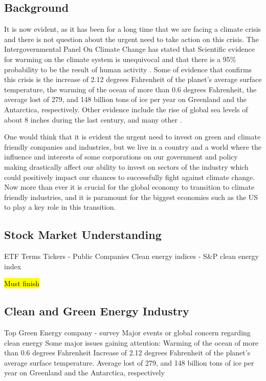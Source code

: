 \documentclass[sigconf, nonacm]{acmart}
\begin{document}
\subsection{Background}
\begin{flushleft}
It is now evident, as it has been for a long time that we are facing a climate crisis and there is not question about the urgent need to take action on this crisis. The Intergovernmental Panel On Climate Change has stated that Scientific evidence for warming on the climate system is unequivocal and that there is a 95\% probability to be the result of human activity \cite{nasa_2021}.  Some of evidence that confirms this crisis is the increase of 2.12 degrees Fahrenheit  of the planet's average surface temperature, the warming of the ocean of more than 0.6 degrees Fahrenheit, the average lost of 279, and 148 billion tons of ice per year on Greenland and the Antarctica, respectively. Other evidence include the rise of global sea levels of about 8 inches during the last century, and many other  \cite{nasa_2021}.
\end{flushleft}

\begin{flushleft}
One would think that it is evident the urgent need to invest on green and climate friendly companies and industries, but we live in a country and a world where the influence and interests of some corporations on our government and policy making drastically affect our ability to invest on sectors of the industry which could positively impact our chances to successfully fight against climate change. Now more than ever it is crucial for the global economy to transition to climate friendly industries, and it is paramount for the biggest economies such as the US to play a key role in this transition. 
\end{flushleft}


\subsection{Stock Market Understanding}
    ETF Terms 
Tickers - Public Companies
Clean energy indices - S\&P clean energy index

\hl{Must finish}
\subsection{Clean and Green Energy Industry }
Top Green Energy company - survey
Major events or global concern regarding clean energy
Some major issues gaining attention:
Warming of the ocean of more than 0.6 degrees Fahrenheit
Increase of 2.12 degrees Fahrenheit of the planet’s average surface temperature.
Average lost of 279, and 148 billion tons of ice per year on Greenland and the Antarctica, respectively
\end{document}
